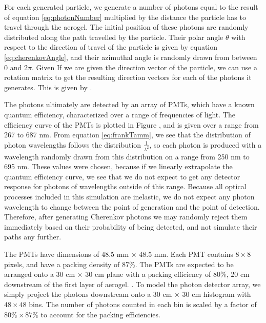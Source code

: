 For each generated particle, we generate a number of photons equal to the result of equation \ref{eq:photonNumber} multiplied by the distance the particle has to travel through the aerogel.
The initial position of these photons are randomly distributed along the path travelled by the particle.
Their polar angle $\theta$ with respect to the direction of travel of the particle is given by equation \ref{eq:cherenkovAngle}, and their azimuthal angle is randomly drawn from between 0 and $2\pi$. Given 
If we are given the direction vector of the particle, we can use a rotation matrix to get the resulting direction vectors for each of the photons it generates.
This is given by .

The photons ultimately are detected by an array of PMTs, which have a known quantum efficiency, characterized over a range of frequencies of light.
The efficiency curve of the PMTs is plotted in  Figure , and is given over a range from 267 to 687 nm.
From equation \ref{eq:frankTamm}, we see that the distribution of photon wavelengths follows the distribution $\frac{1}{\lambda^2}$, so each photon is produced with a wavelength randomly drawn from this distribution on a range from 250 nm to 695 nm.
These values were chosen, because if we linearly extrapolate the quantum efficiency curve, we see that we do not expect to get any detector response for photons of wavelengths outside of this range.
Because all optical processes included in this simulation are inelastic, we do not expect any photon wavelength to change between the point of generation and the point of detection.
Therefore, after generating Cherenkov photons we may randomly reject them immediately based on their probability of being detected, and not simulate their paths any further.

The PMTs have dimensions of 48.5 mm $\times$ 48.5 mm.
Each PMT contains $8 \times 8$ pixels, and have a packing density of 87\%. 
The PMTs are expected to be arranged onto a 30 cm $\times$ 30 cm plane with a packing efficiency of $80\%$, 20 cm downstream of the first layer of aerogel.
.
To model the photon detector array, we simply project the photons downstream onto a 30 cm $\times$ 30 cm histogram with $48 \times 48$ bins.
The number of photons counted in each bin is scaled by a factor of $80\% \times 87\%$ to account for the packing efficiencies.

